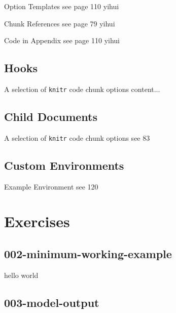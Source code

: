 \documentclass[10pt]{beamer}\usepackage[]{graphicx}\usepackage[]{color}
\begin{document}
\begin{frame}{Option Templates}
see page 110 yihui
\end{frame}

\begin{frame}{Chunk References}
see page 79 yihui
\end{frame}


\begin{frame}{Code in Appendix}
see page 110 yihui
\end{frame}



\subsection{Hooks}
\begin{frame}{A selection of \texttt{knitr} code chunk options}
content...
\end{frame}


\subsection{Child Documents}
\begin{frame}{A selection of \texttt{knitr} code chunk options}
see 83
\end{frame}



\subsection{Custom Environments}
\begin{frame}{Example Environment}
see 120
\end{frame}

\section{Exercises}

\subsection{002-minimum-working-example}

\begin{frame}
hello world
\end{frame}


\subsection{003-model-output}
\end{document}
